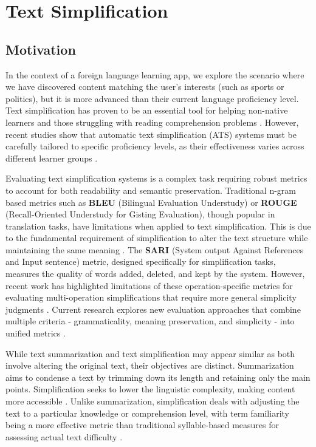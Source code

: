 \section{Text Simplification}\label{sec:simplification}

\subsection{Motivation}

In the context of a foreign language learning app, we explore the scenario where we have discovered content matching the user's interests (such as sports or politics), but it is more advanced than their current language proficiency level. Text simplification has proven to be an essential tool for helping non-native learners and those struggling with reading comprehension problems \cite{automated_althanyyan_2021}. However, recent studies show that automatic text simplification (ATS) systems must be carefully tailored to specific proficiency levels, as their effectiveness varies across different learner groups \cite{odo2022effect}.

Evaluating text simplification systems is a complex task requiring robust metrics to account for both readability and semantic preservation. Traditional n-gram based metrics such as \textbf{BLEU} (Bilingual Evaluation Understudy) or \textbf{ROUGE} (Recall-Oriented Understudy for Gisting Evaluation), though popular in translation tasks, have limitations when applied to text simplification. This is due to the fundamental requirement of simplification to alter the text structure while maintaining the same meaning \cite{automated_althanyyan_2021} \cite{rethinking_scialom_2021}. The \textbf{SARI} (System output Against References and Input sentence) metric, designed specifically for simplification tasks, measures the quality of words added, deleted, and kept by the system. However, recent work has highlighted limitations of these operation-specific metrics for evaluating multi-operation simplifications that require more general simplicity judgments \cite{alvamanchego2021unsuitability}. Current research explores new evaluation approaches that combine multiple criteria - grammaticality, meaning preservation, and simplicity - into unified metrics \cite{ajlouni2023towards}.

While text summarization and text simplification may appear similar as both involve altering the original text, their objectives are distinct. Summarization aims to condense a text by trimming down its length and retaining only the main points. Simplification seeks to lower the linguistic complexity, making content more accessible \cite{rethinking_scialom_2021}. Unlike summarization, simplification deals with adjusting the text to a particular knowledge or comprehension level, with term familiarity being a more effective metric than traditional syllable-based measures for assessing actual text difficulty \cite{kauchak2016moving}.

